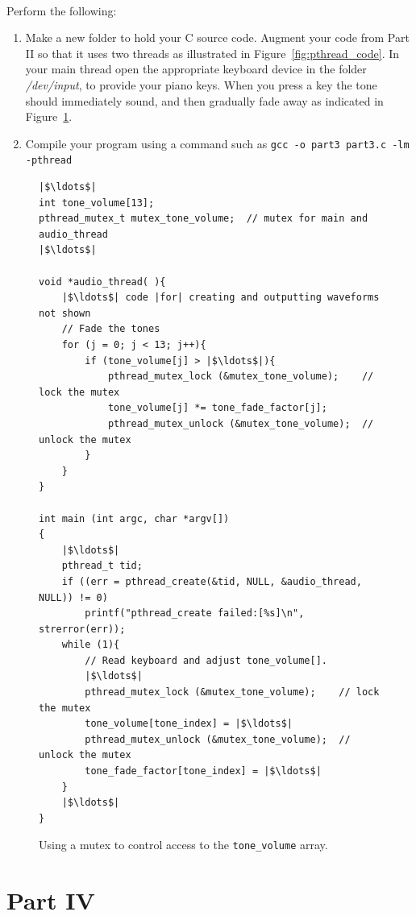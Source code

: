 \documentclass[epsfig,10pt,fullpage]{article}
\begin{document}
~\\
\noindent
Perform the following:

\begin{enumerate}
\item Make a new folder to hold your C source code. Augment your code from Part II so that
it uses two threads as illustrated in Figure~\ref{fig:pthread_code}. In your main thread
open the appropriate keyboard device in the folder {\it /dev/input}, to provide your piano keys.
When you press a key the tone should immediately sound, and then gradually fade away as
indicated in Figure~\ref{fig:mutex}.
\item Compile your program using a command such as \texttt{gcc -o part3 part3.c -lm -pthread}
\end{enumerate}

\lstset{language=C,numbers=none,escapechar=|}
\begin{figure}[H]
\begin{center}
\begin{minipage}[t]{14.75 cm}
\begin{lstlisting}
|$\ldots$|
int tone_volume[13];
pthread_mutex_t mutex_tone_volume;  // mutex for main and audio_thread
|$\ldots$|

void *audio_thread( ){
	|$\ldots$| code |for| creating and outputting waveforms not shown
	// Fade the tones
	for (j = 0; j < 13; j++){
		if (tone_volume[j] > |$\ldots$|){
			pthread_mutex_lock (&mutex_tone_volume);	// lock the mutex
			tone_volume[j] *= tone_fade_factor[j];
			pthread_mutex_unlock (&mutex_tone_volume);	// unlock the mutex
		}
	}
}

int main (int argc, char *argv[])
{
	|$\ldots$|
	pthread_t tid;
	if ((err = pthread_create(&tid, NULL, &audio_thread, NULL)) != 0)
		printf("pthread_create failed:[%s]\n", strerror(err));
	while (1){
		// Read keyboard and adjust tone_volume[].
		|$\ldots$|
		pthread_mutex_lock (&mutex_tone_volume);	// lock the mutex
		tone_volume[tone_index] = |$\ldots$|
		pthread_mutex_unlock (&mutex_tone_volume);	// unlock the mutex
		tone_fade_factor[tone_index] = |$\ldots$|
	}
	|$\ldots$|
}
\end{lstlisting}
\end{minipage}
\end{center}
\vspace{-0.33in}\caption{Using a mutex to control access to the \texttt{tone\_volume} array.}
\label{fig:mutex}
\end{figure}

\noindent
\section*{Part IV}
\end{document}
